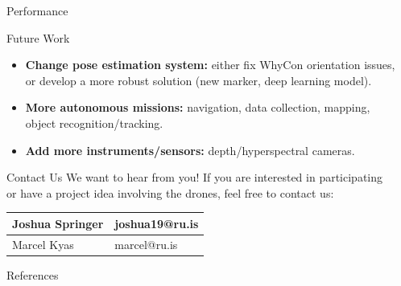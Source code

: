 \documentclass[final, 20pt]{beamer}
\newlength{\sepwidth}
\newlength{\colwidth}
\newcommand{\separatorcolumn}{\begin{column}{\sepwidth}\end{column}}
\begin{document}
\begin{frame}[t]
\begin{columns}[t]
\begin{column}{\colwidth}
\begin{alertblock}{Performance}
  \end{alertblock}

  \begin{block}{Future Work}

    \begin{itemize}
      \item \textbf{Change pose estimation system:} either fix WhyCon orientation issues, or develop a more robust solution (new marker, deep learning model).
      \item \textbf{More autonomous missions:} navigation, data collection, mapping, object recognition/tracking.
      \item \textbf{Add more instruments/sensors:} depth/hyperspectral cameras.
    \end{itemize}

  \end{block}

  \begin{alertblock}{Contact Us}
    We want to hear from you!
    If you are interested in participating or have a project idea involving the drones, feel free to contact us:

    \begin{center}
      \begin{tabular}{|l|l|}
        \hline
        Joshua Springer & joshua19@ru.is\\\hline
        Marcel Kyas & marcel@ru.is\\\hline
    \end{tabular}
    \end{center}
  \end{alertblock}

  \begin{block}{References}
    \vspace{-0.5cm}
    
    \footnotesize{}

  \end{block}

\end{column}

\separatorcolumn
\end{columns}
\end{frame}
\end{document}
